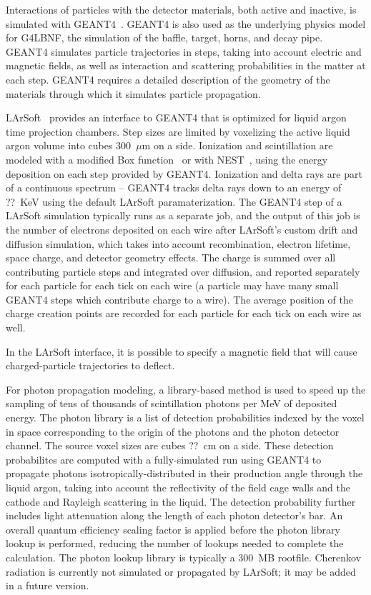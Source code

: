 Interactions of particles with the detector materials, both active and inactive, is simulated with 
GEANT4~\cite{GEANT4:NIM}\cite{GEANT4}.  GEANT4 is also used as the underlying physics model for G4LBNF, the
simulation of the baffle, target, horns, and decay pipe.  GEANT4 simulates particle trajectories in steps,
taking into account electric and magnetic fields, as well as interaction and scattering probabilities in the
matter at each step.  GEANT4 requires a detailed description of the geometry of the materials through which
it simulates particle propagation.

LArSoft~\cite{larsoft} provides an interface to GEANT4 that is optimized for liquid argon time projection
chambers.  Step sizes are limited by voxelizing the active liquid argon volume into cubes 300~$\mu$m on a side.
Ionization and scintillation are modeled with a modified Box function~\cite{box} or with NEST~\cite{nest}, using
the energy deposition on each step provided by GEANT4.  Ionization and delta rays are part of a continuous
spectrum -- GEANT4 tracks delta rays down to an energy of ??~KeV using the default LArSoft paramaterization.
The GEANT4 step of a LArSoft simulation typically runs as a separate job, and the output of this job is the
number of electrons deposited on each wire after LArSoft's custom drift and diffusion simulation, which
takes into account recombination, electron lifetime, space charge, and detector geometry effects.  The charge
is summed over all contributing particle steps and integrated over diffusion, and reported separately for
each particle for each tick on each wire (a particle may have many small GEANT4 steps which contribute
charge to a wire).  The average position of the charge creation points are recorded for each particle for each
tick on each wire as well.  

In the LArSoft interface,  it is possible to specify a magnetic field that will cause charged-particle
trajectories to deflect.

For photon propagation modeling, a library-based method is used to speed up the sampling of tens of thousands of
scintillation photons per MeV of deposited energy.  The photon library is a list of detection probabilities
indexed by the voxel in space corresponding to the origin of the photons and the photon detector channel.
The source voxel sizes are cubes ??~cm on a side.  These detection probabilites are computed with a fully-simulated
run using GEANT4 to propagate photons isotropically-distributed in their production angle through the liquid argon,
taking into account the reflectivity of the field cage walls and the cathode and Rayleigh scattering in the liquid.
The detection probability further includes light attenuation along the length of each photon detector's bar.  An
overall quantum efficiency scaling factor is applied before the photon library lookup is performed, reducing the
number of lookups needed to complete the calculation.  The photon lookup library is typically a 300~MB rootfile.
Cherenkov radiation is currently not simulated or propagated by LArSoft; it may be added in a future version.

